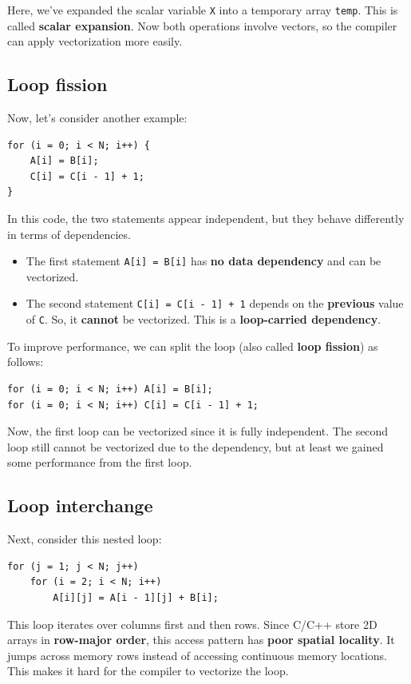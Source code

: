 \documentclass[12pt]{book}
\begin{document}
Here, we’ve expanded the scalar variable \texttt{X} into a temporary array \texttt{temp}. This is called \textbf{scalar expansion}. Now both operations involve vectors, so the compiler can apply vectorization more easily.

\subsection{Loop fission}
Now, let’s consider another example:
\begin{lstlisting}[style=cppstyle]
for (i = 0; i < N; i++) {
    A[i] = B[i];
    C[i] = C[i - 1] + 1;
}
\end{lstlisting}

In this code, the two statements appear independent, but they behave differently in terms of dependencies.

\begin{itemize}
    \item The first statement \texttt{A[i] = B[i]} has \textbf{no data dependency} and can be vectorized.
    \item The second statement \texttt{C[i] = C[i - 1] + 1} depends on the \textbf{previous} value of \texttt{C}. So, it \textbf{cannot} be vectorized. This is a \textbf{loop-carried dependency}.
\end{itemize}

To improve performance, we can split the loop (also called \textbf{loop fission}) as follows:

\begin{lstlisting}[style=cppstyle]
for (i = 0; i < N; i++) A[i] = B[i];
for (i = 0; i < N; i++) C[i] = C[i - 1] + 1;
\end{lstlisting}

Now, the first loop can be vectorized since it is fully independent. The second loop still cannot be vectorized due to the dependency, but at least we gained some performance from the first loop.

\subsection{Loop interchange}
Next, consider this nested loop:
\begin{lstlisting}[style=cppstyle]
for (j = 1; j < N; j++)
    for (i = 2; i < N; i++)
        A[i][j] = A[i - 1][j] + B[i];
\end{lstlisting}

This loop iterates over columns first and then rows. Since C/C++ store 2D arrays in \textbf{row-major order}, this access pattern has \textbf{poor spatial locality}. It jumps across memory rows instead of accessing continuous memory locations. This makes it hard for the compiler to vectorize the loop.
\end{document}
